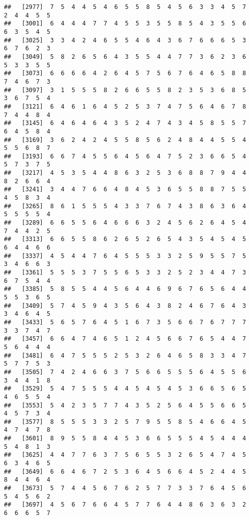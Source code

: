 \documentclass[
]{book}
\begin{document}
\begin{verbatim}
##   [2977]  7  5  4  4  5  4  6  5  5  8  5  4  5  6  3  3  4  5  7  2  4  4  5  5
##   [3001]  6  4  4  4  7  7  4  5  5  3  5  5  8  5  4  3  5  5  6  6  3  5  4  5
##   [3025]  3  3  4  2  4  6  5  5  4  6  4  3  6  7  6  6  6  5  3  6  7  6  2  3
##   [3049]  5  8  2  6  5  6  4  3  5  5  4  4  7  7  3  6  2  3  6  5  3  3  5  5
##   [3073]  6  6  6  6  4  2  6  4  5  7  5  6  7  6  4  6  5  8  8  7  4  6  7  3
##   [3097]  3  1  5  5  5  8  2  6  6  5  5  8  2  3  5  3  6  8  5  3  6  7  5  4
##   [3121]  6  4  6  1  6  4  5  2  5  3  7  4  7  5  6  4  6  7  8  7  4  4  8  4
##   [3145]  6  4  6  4  6  4  3  5  2  4  7  4  3  4  5  8  5  5  7  6  4  5  8  4
##   [3169]  3  6  2  4  2  4  5  5  8  5  6  2  4  8  4  4  5  5  4  5  5  6  8  7
##   [3193]  6  6  7  4  5  5  6  4  5  6  4  7  5  2  3  6  6  5  4  5  7  3  7  5
##   [3217]  4  5  3  5  4  4  8  6  3  2  5  3  6  8  8  7  9  4  4  8  2  6  6  4
##   [3241]  3  4  4  7  6  6  4  8  4  5  3  6  5  5  8  8  7  5  5  4  5  8  3  4
##   [3265]  8  6  1  5  5  5  4  3  3  7  6  7  4  3  8  6  3  6  4  5  5  5  5  4
##   [3289]  6  6  5  5  6  4  6  6  6  3  2  4  5  6  2  6  4  5  4  7  4  4  2  5
##   [3313]  6  6  5  5  8  6  2  6  5  2  6  5  4  3  5  4  5  4  5  6  4  4  6  6
##   [3337]  4  5  4  4  7  6  4  5  5  5  3  3  2  5  9  5  5  7  5  3  4  6  6  3
##   [3361]  5  5  5  3  7  5  5  6  5  3  3  2  5  2  3  4  4  7  3  6  7  5  4  4
##   [3385]  5  8  5  5  4  4  5  6  4  4  6  9  6  7  6  5  6  4  4  5  5  3  6  5
##   [3409]  5  7  4  5  9  4  3  5  6  4  3  8  2  4  6  7  6  4  3  3  4  6  4  5
##   [3433]  5  6  5  7  6  4  5  1  6  7  3  5  6  6  7  6  7  7  7  3  3  7  4  7
##   [3457]  6  6  4  7  4  6  5  1  2  4  5  6  6  7  6  5  4  4  7  5  6  4  4  4
##   [3481]  6  4  7  5  5  5  2  5  3  2  6  4  6  5  8  3  3  4  7  5  7  7  5  3
##   [3505]  7  4  2  4  6  6  3  7  5  6  6  5  5  5  6  4  5  5  6  3  4  4  1  8
##   [3529]  5  4  7  5  5  5  4  4  5  4  5  4  5  3  6  6  5  6  5  4  6  5  5  4
##   [3553]  5  4  2  3  5  7  7  4  3  5  2  5  6  4  5  5  6  6  5  4  5  7  3  4
##   [3577]  8  5  5  5  3  3  2  5  7  9  5  5  8  5  4  6  6  4  5  4  7  4  7  8
##   [3601]  8  9  5  5  8  4  4  5  3  6  6  5  5  5  4  5  4  4  4  5  4  8  1  3
##   [3625]  4  4  7  7  6  3  7  5  6  5  5  3  2  6  5  4  7  4  5  6  3  4  6  5
##   [3649]  6  6  4  6  7  2  5  3  6  4  5  6  6  4  5  2  4  4  5  8  4  4  6  4
##   [3673]  5  7  4  4  5  6  7  6  2  5  7  7  3  3  7  6  4  5  6  5  4  5  6  2
##   [3697]  4  5  6  7  6  6  4  5  7  7  6  4  4  8  6  3  6  3  2  6  6  6  5  7

\end{verbatim}
\end{document}
